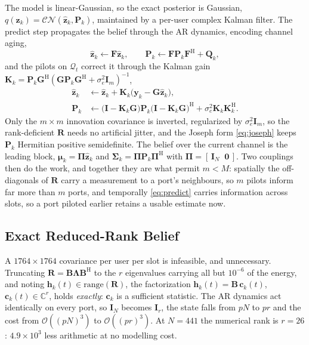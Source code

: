 \documentclass[journal]{IEEEtran}
\newcommand{\bh}{\mathbf{h}}
\newcommand{\bR}{\mathbf{R}}
\newcommand{\bI}{\mathbf{I}}
\newcommand{\bP}{\mathbf{P}}
\newcommand{\bF}{\mathbf{F}}
\newcommand{\by}{\mathbf{y}}
\newcommand{\bz}{\mathbf{z}}
\newcommand{\bB}{\mathbf{B}}
\newcommand{\bmu}{\boldsymbol{\mu}}
\newcommand{\bSig}{\boldsymbol{\Sigma}}
\newcommand{\CN}{\mathcal{CN}}
\newcommand{\bbC}{\mathbb{C}}
\begin{document}
The model is linear-Gaussian, so the exact posterior is Gaussian,
$q(\bz_k)=\CN(\hat{\bz}_k,\bP_k)$, maintained by a per-user complex Kalman
filter. The predict step propagates the belief through the AR dynamics,
encoding channel aging,
\begin{equation}
  \hat{\bz}_k \leftarrow \bF\hat{\bz}_k,
  \qquad
  \bP_k \leftarrow \bF\bP_k\bF^{\mathrm{H}} + \mathbf{Q}_k ,
  \label{eq:predict}
\end{equation}
and the pilots on $\mathcal{Q}_t$ correct it through the Kalman gain
$\mathbf{K}_k=\bP_k\mathbf{G}^{\mathrm{H}}
(\mathbf{G}\bP_k\mathbf{G}^{\mathrm{H}}+\sigma_e^2\bI_m)^{-1}$,
\begin{align}
  \hat{\bz}_k &\leftarrow \hat{\bz}_k
     + \mathbf{K}_k\big(\by_k-\mathbf{G}\hat{\bz}_k\big),
  \label{eq:mean}\\
  \bP_k &\leftarrow
     \big(\bI-\mathbf{K}_k\mathbf{G}\big)\bP_k
     \big(\bI-\mathbf{K}_k\mathbf{G}\big)^{\mathrm{H}}
     + \sigma_e^2\mathbf{K}_k\mathbf{K}_k^{\mathrm{H}} .
  \label{eq:joseph}
\end{align}
Only the $m\times m$ innovation covariance is inverted, regularized by
$\sigma_e^2\bI_m$, so the rank-deficient $\bR$ needs no artificial jitter, and
the Joseph form \eqref{eq:joseph} keeps $\bP_k$ Hermitian positive
semidefinite. The belief over the current channel is the leading block,
$\bmu_k=\boldsymbol{\Pi}\hat{\bz}_k$ and
$\bSig_k=\boldsymbol{\Pi}\bP_k\boldsymbol{\Pi}^{\mathrm{H}}$ with
$\boldsymbol{\Pi}=[\,\bI_N\;\;\mathbf{0}\,]$. Two couplings then do the work,
and together they are what permit $m<M$: spatially the off-diagonals of $\bR$
carry a measurement to a port's neighbours, so $m$ pilots inform far more than
$m$ ports, and temporally \eqref{eq:predict} carries information across slots,
so a port piloted earlier retains a usable estimate now.

\subsection{Exact Reduced-Rank Belief}
A $1764\times1764$ covariance per user per slot is infeasible, and
unnecessary. Truncating $\bR=\bB\boldsymbol{\Lambda}\bB^{\mathrm{H}}$ to the $r$
eigenvalues carrying all but $10^{-6}$ of the energy, and noting
$\bh_k(t)\in\mathrm{range}(\bR)$, the factorization
$\bh_k(t)=\bB\,\mathbf{c}_k(t)$, $\mathbf{c}_k(t)\in\bbC^{r}$, holds
\emph{exactly}: $\mathbf{c}_k$ is a sufficient statistic. The AR dynamics act
identically on every port, so $\bI_N$ becomes $\bI_r$, the state falls from $pN$
to $pr$ and the cost from $\mathcal{O}((pN)^3)$ to $\mathcal{O}((pr)^3)$. At
$N=441$ the numerical rank is $r=26$: $4.9\times10^{3}$ less arithmetic at no
modelling cost.
\end{document}
